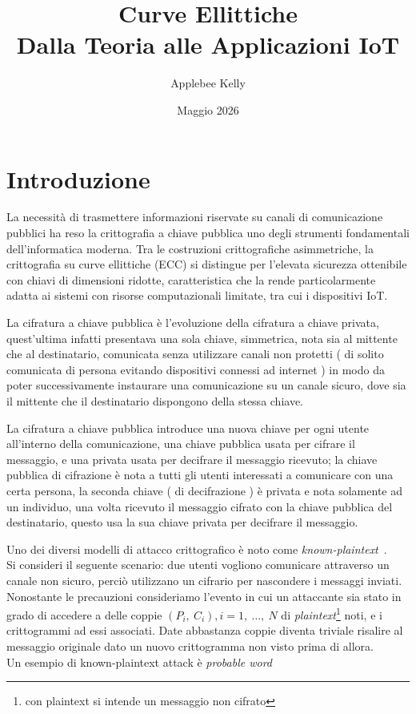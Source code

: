 \documentclass[12pt, a4paper]{report}
\title{Curve Ellittiche \\ \large Dalla Teoria alle Applicazioni IoT}
\author{Applebee Kelly}
\date{Maggio 2026}
\begin{document}
\maketitle

\tableofcontents

\chapter{Introduzione}
La necessità di trasmettere informazioni riservate su canali di comunicazione pubblici ha reso la crittografia a chiave pubblica uno degli strumenti fondamentali dell'informatica moderna. Tra le costruzioni crittografiche asimmetriche, la crittografia su curve ellittiche (ECC) si distingue per l'elevata sicurezza ottenibile con chiavi di dimensioni ridotte, caratteristica che la rende particolarmente adatta ai sistemi con risorse computazionali limitate, tra cui i dispositivi IoT.

La cifratura a chiave pubblica è l'evoluzione della cifratura a chiave privata, quest'ultima infatti presentava una sola chiave, simmetrica, nota sia al mittente che al destinatario, comunicata senza utilizzare canali non protetti ( di solito comunicata di persona evitando dispositivi connessi ad internet ) in modo da poter successivamente instaurare una comunicazione su un canale sicuro, dove sia il mittente che il destinatario dispongono della stessa chiave.

La cifratura a chiave pubblica introduce una nuova chiave per ogni utente all'interno della comunicazione, una chiave pubblica usata per cifrare il messaggio, e una privata usata per decifrare il messaggio ricevuto; la chiave pubblica di cifrazione è nota a tutti gli utenti interessati a comunicare con una certa persona, la seconda chiave ( di decifrazione ) è privata e nota solamente ad un individuo, una volta ricevuto il messaggio cifrato con la chiave pubblica del destinatario, questo usa la sua chiave privata per decifrare il messaggio.

Uno dei diversi modelli di attacco crittografico è noto come \textit{known-plaintext}\ \cite{Sabrina}.
\\Si consideri il seguente scenario: due utenti vogliono comunicare attraverso un canale non sicuro,
perciò utilizzano un cifrario per nascondere i messaggi inviati.
\\Nonostante le precauzioni consideriamo l'evento in cui un attaccante sia stato in grado di accedere
a delle coppie $(P_i,\ C_i), i = 1,\ \dots, \ N$ di \textit{plaintext}\footnote
{con plaintext si intende un messaggio non cifrato} noti, e i crittogrammi ad essi associati.
Date abbastanza coppie diventa triviale risalire al messaggio originale dato un nuovo
crittogramma non visto prima di allora.
\\Un esempio di known-plaintext attack è \textit{probable word}
\end{document}
